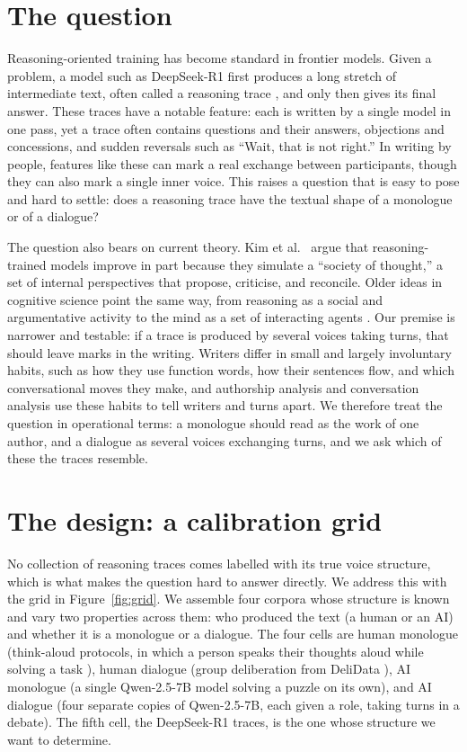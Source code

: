 \documentclass[10pt,twocolumn]{article}
\begin{document}
\section{The question}
Reasoning-oriented training has become standard in frontier models. Given a problem, a model such as
DeepSeek-R1 \cite{guo2025} first produces a long stretch of intermediate text, often called a
reasoning trace \cite{kambhampati2025}, and only then gives its final answer. These traces have a
notable feature: each is written by a single model in one pass, yet a trace often contains questions
and their answers, objections and concessions, and sudden reversals such as ``Wait, that is not
right.'' In writing by people, features like these can mark a real exchange between participants,
though they can also mark a single inner voice. This raises a question that is easy to pose and hard
to settle: does a reasoning trace have the textual shape of a monologue or of a dialogue?

The question also bears on current theory. Kim et al.~\cite{kim2026} argue that reasoning-trained
models improve in part because they simulate a ``society of thought,'' a set of internal perspectives
that propose, criticise, and reconcile. Older ideas in cognitive science point the same way, from
reasoning as a social and argumentative activity \cite{mercier2017} to the mind as a set of
interacting agents \cite{minsky1986}. Our premise is narrower and testable: if a trace is produced by
several voices taking turns, that should leave marks in the writing. Writers differ in small and
largely involuntary habits, such as how they use function words, how their sentences flow, and which
conversational moves they make, and authorship analysis and conversation analysis use these habits to
tell writers and turns apart. We therefore treat the question in operational terms: a monologue
should read as the work of one author, and a dialogue as several voices exchanging turns, and we ask
which of these the traces resemble.

\section{The design: a calibration grid}
No collection of reasoning traces comes labelled with its true voice structure, which is what makes
the question hard to answer directly. We address this with the grid in Figure~\ref{fig:grid}. We
assemble four corpora whose structure is known and vary two properties across them: who produced the
text (a human or an AI) and whether it is a monologue or a dialogue. The four cells are human
monologue (think-aloud protocols, in which a person speaks their thoughts aloud while solving a task
\cite{wurgaft2025}), human dialogue (group deliberation from DeliData \cite{karadzhov2023}), AI
monologue (a single Qwen-2.5-7B model solving a puzzle on its own), and AI dialogue (four separate
copies of Qwen-2.5-7B, each given a role, taking turns in a debate). The fifth cell, the DeepSeek-R1
traces, is the one whose structure we want to determine.
\end{document}
